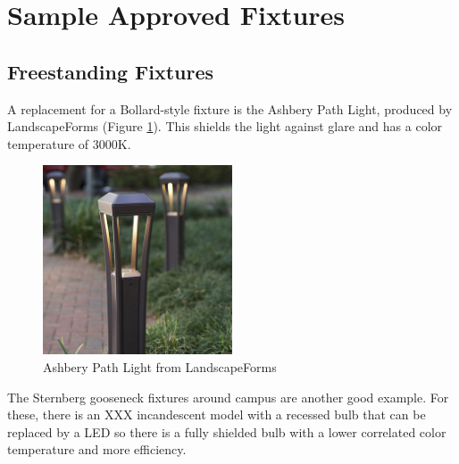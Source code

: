 \documentclass[12pt, oneside]{article}
\begin{document}
\section{Sample Approved Fixtures}
\subsection{Freestanding Fixtures}
A replacement for a Bollard-style fixture is the Ashbery Path Light, produced by LandscapeForms (Figure \ref{Ashbury}). This shields the light against glare and has a color temperature of 3000K.
\begin{figure}[p]
	\centering
	\includegraphics[width=0.5\textwidth]{Ashbery_PathLight-09_main.jpg}
	\caption[Ashbery Path Light]{Ashbery Path Light from LandscapeForms}
	\label{Ashbury}
\end{figure}
The Sternberg gooseneck fixtures around campus are another good example. For these, there is an XXX incandescent model with a recessed bulb that can be replaced by a LED so there is a fully shielded bulb with a lower correlated color temperature and more efficiency. 
\end{document}
